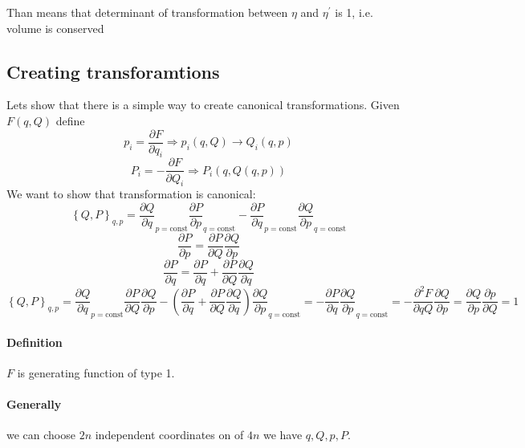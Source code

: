 Than means that determinant of transformation between $\eta$ and $\eta^\prime$ is 1, i.e. volume is conserved
\subsection{Creating transforamtions}
Lets show that there is a simple way to create canonical transformations. Given $F(q,Q)$ define
$$p_i = \frac{\partial F}{\partial q_i} \Rightarrow p_i(q,Q) \to Q_i(q,p)$$
$$P_i = -\frac{\partial F}{\partial Q_i} \Rightarrow P_i(q,Q(q,p))$$
We want to show that transformation is canonical:
$$\left\{ Q,P \right\}_{q,p} = \frac{\partial Q}{\partial q}_{p=\text{const}}\frac{\partial P}{\partial p}_{q=\text{const}} - \frac{\partial P}{\partial q}_{p=\text{const}}\frac{\partial Q}{\partial p}_{q=\text{const}} $$
$$\frac{\partial P}{\partial p} = \frac{\partial P}{\partial Q}\frac{\partial Q}{\partial p}$$
$$\frac{\partial P}{\partial q} = \frac{\partial P}{\partial q}+\frac{\partial P}{\partial Q}\frac{\partial Q}{\partial q}$$
$$\left\{ Q,P \right\}_{q,p} = \frac{\partial Q}{\partial q}_{p=\text{const}}\frac{\partial P}{\partial Q}\frac{\partial Q}{\partial p} -  \left(\frac{\partial P}{\partial q}+\frac{\partial P}{\partial Q}\frac{\partial Q}{\partial q}\right)\frac{\partial Q}{\partial p}_{q=\text{const}} = - \frac{\partial P}{\partial q}\frac{\partial Q}{\partial p}_{q=\text{const}} = - \frac{\partial^2 F}{\partial qQ}\frac{\partial Q}{\partial p} = \frac{\partial Q}{\partial p}\frac{\partial p}{\partial Q}=1$$
\paragraph{Definition} $F$ is generating function of type 1.
\paragraph{Generally} we can choose $2n$ independent coordinates on of $4n$ we have $q,Q,p,P$. 
